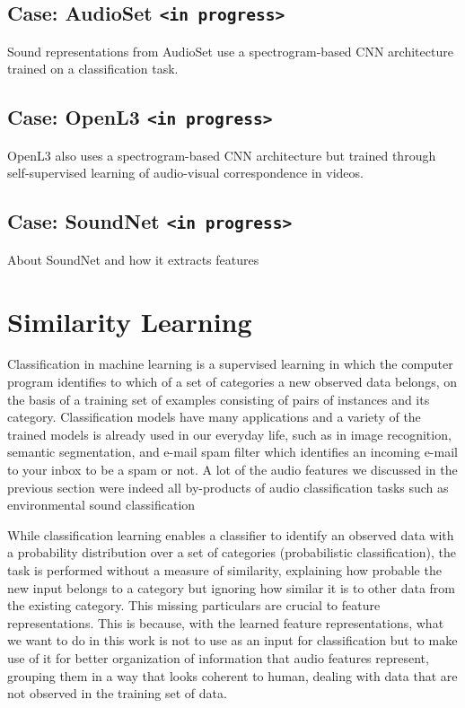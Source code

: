 \subsection{Case: AudioSet \texttt{<in progress>}}
Sound representations  from AudioSet \cite{jort2017} use a spectrogram-based CNN architecture trained on a classification task.

\subsection{Case: OpenL3 \texttt{<in progress>}}
OpenL3 \cite{OpenL3} also uses a spectrogram-based CNN architecture but trained through self-supervised learning of audio-visual correspondence in videos.

\subsection{Case: SoundNet \texttt{<in progress>}}
About SoundNet and how it extracts features

\section{Similarity Learning}
Classification in machine learning is a supervised learning in which the computer program identifies to which of a set of categories a new observed data belongs, on the basis of a training set of examples consisting of pairs of instances and its category. Classification models have many applications and a variety of the trained models is already used in our everyday life, such as in image recognition, semantic segmentation, and e-mail spam filter which identifies an incoming e-mail to your inbox to be a spam or not. A lot of the audio features we discussed in the previous section were indeed all by-products of audio classification tasks such as environmental sound classification

While classification learning enables a classifier to identify an observed data with a probability distribution over a set of categories (probabilistic classification), the task is performed without a measure of similarity, explaining how probable the new input belongs to a category but ignoring how similar it is to other data from the existing category. This missing particulars are crucial to feature representations. This is because, with the learned feature representations, what we want to do in this work is not to use as an input for classification but to make use of it for better organization of information that audio features represent, grouping them in a way that looks coherent to human, dealing with data that are not observed in the training set of data.

